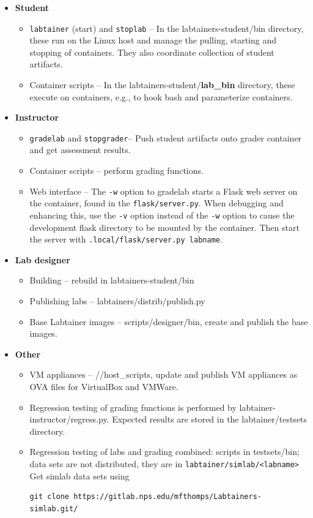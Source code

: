 \documentclass[12pt]{article}
\begin{document}
\begin{itemize}
	\item {\bf Student} \begin{itemize}
\item {\tt labtainer} (start) and {\tt stoplab} -- In the labtainers-student/bin directory, these run on the 
Linux host and manage the pulling, starting and stopping of containers.  They also coordinate
collection of student artifacts.
\item Container scripts -- In the labtainers-student/{\bf lab\_bin} directory, these execute on
containers, e.g., to hook bash and parameterize containers.
	\end{itemize}

	\item {\bf Instructor} \begin{itemize}
\item {\tt gradelab} and {\tt stopgrader}-- Push student artifacts onto grader container and get assessment results.
\item Container scripts -- perform grading functions.
\item Web interface -- The {\tt -w} option to gradelab starts a Flask web server on the container, found in the
{\tt flask/server.py}.  When debugging and enhancing this, use the {\tt -v} option instead of the {\tt -w} option to
cause the development flask directory to be mounted by the container.  Then start the server with {\tt .local/flask/server.py labname}.
	\end{itemize}

	\item {\bf Lab designer} \begin{itemize}
\item Building -- rebuild in labtainers-student/bin 
\item Publishing labs -- labtainers/distrib/publish.py
\item Base Labtainer images -- scripts/designer/bin, create and publish the base images.
	\end{itemize}	

	\item {\bf Other} \begin{itemize}
\item VM appliances -- //host\_scripts, update and publish VM appliances as OVA files for 
VirtualBox and VMWare.
\item Regression testing of grading functions is performed by labtainer-instructor/regress.py.
Expected results are stored in the labtainer/testsets directory.
\item Regression testing of labs and grading combined: scripts in testsets/bin; data sets
are not distributed, they are in {\tt labtainer/simlab/<labname>}  Get simlab data sets using
\begin{verbatim}
git clone https://gitlab.nps.edu/mfthomps/Labtainers-simlab.git/
\end{verbatim}

       \end{itemize}

\end{itemize}
\end{document}

